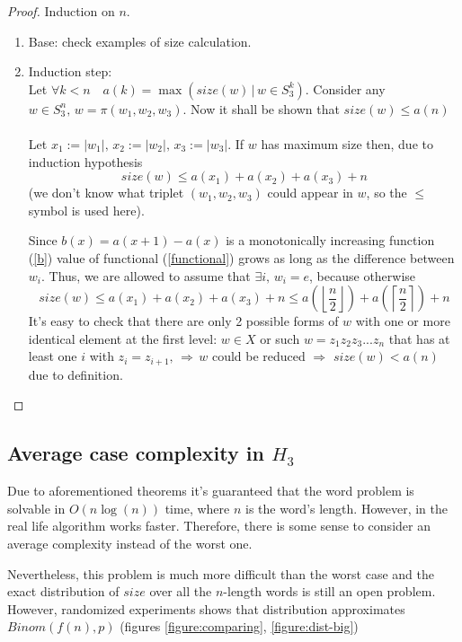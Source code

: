\documentclass[a4paper,12pt]{amsart}
\begin{document}
\begin{proof}
	Induction on $n$.
	\begin{enumerate}
		\item Base: check examples of size calculation.
		\item Induction step:\\
		Let $\forall k < n \quad a (k) = \max (size(w) \,|\, w \in S_3^k)$. Consider any $w \in S_3^{n}, \, w = \pi (w_1, w_2, w_3)$. Now it shall be shown that $size(w) \le a(n)$\\
		\\
		Let $ x_1 := |w_1|, \, x_2 := |w_2|, \, x_3 := |w_3|$. If $w$ has maximum size then, due to induction hypothesis \\
		\begin{equation}
		\label{functional}
		size(w) \le a(x_1) + a(x_2) + a(x_3) + n
		\end{equation}
		(we don't know what triplet $(w_1, w_2, w_3)$ could appear in $w$, so the $\le$ symbol is used here). 
		
		Since $b(x) = a(x + 1) - a(x)$ is a monotonically increasing function (\ref{b}) value of functional (\ref{functional})
		grows as long as the difference between $w_i$. Thus,
		we are allowed to assume that $\exists i, \, w_i = e$, because otherwise
		$$size(w) \le a(x_1) + a(x_2) + a(x_3) + n \le a\left(
		\left\lfloor
		\frac{n}{2}
		\right\rfloor
		\right) + a \left(
		\left\lceil
		\frac{n}{2}
		\right\rceil
		\right) + n$$
		It's easy to check that there are only 2 possible forms of $w$ with one or more identical element at the first level: $w \in X$ or such $w = z_1 z_2 z_3 ... z_n$ that has at least one $i$ with $z_i = z_{i+1}, \, \Rightarrow \, w$ could be reduced $\Rightarrow$ $size(w) < a(n)$ due to definition.
	\end{enumerate}
	
\end{proof}


\subsection{Average case complexity in $H_3$}

Due to aforementioned theorems it's guaranteed that the word problem is solvable in $O(n\log(n))$ time, where $n$ is the word's length. However, in the real life algorithm works faster. Therefore, there is some sense to consider an average complexity instead of the worst one. 

Nevertheless, this problem is much more difficult than the worst case and the exact distribution of $size$ over all the $n$-length words is still an open problem. However, randomized experiments shows that distribution approximates $Binom(f(n), p)$ (figures \ref{figure:comparing}, \ref{figure:dist-big})
\end{document}
